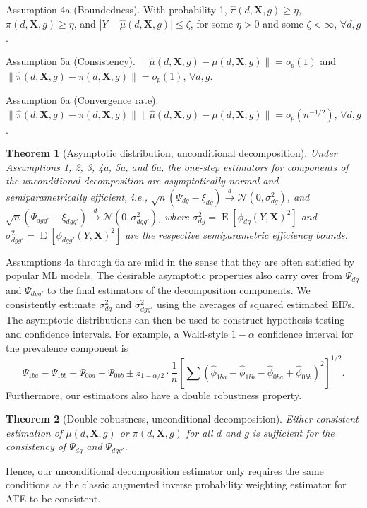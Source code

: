 \documentclass[12pt,a4paper]{article}
\newtheorem{prop}{Theorem}
\newcommand{\E}{\operatorname{E}}
\def\X{{\boldsymbol X}}
\begin{document}
Assumption 4a (Boundedness). With probability 1, $\hat{\pi}(d,\X,g) \geq \eta$, $\pi(d,\X,g) \geq \eta$, and $|Y-\hat{\mu}(d,\X,g)| \leq \zeta$, for some $\eta>0$ and some $\zeta < \infty$, $\forall d, g$.

Assumption 5a (Consistency).  $\| \hat{\mu}(d,\X,g) - \mu(d,\X,g) \| =o_p(1)$ and $\| \hat{\pi}(d,\X,g) - \pi(d,\X,g) \| =o_p(1)$, $\forall d, g$.

Assumption 6a (Convergence rate).  $\|\hat{\pi}(d,\X,g)-\pi(d,\X,g)\| \|\hat{\mu}(d,\X,g)-\mu(d,\X,g)\|=o_p(n^{-1/2})$, $\forall d, g$.

\begin{prop}[Asymptotic distribution, unconditional decomposition]
Under Assumptions 1, 2, 3, 4a, 5a, and 6a, the one-step estimators for components of the unconditional decomposition are asymptotically normal and semiparametrically efficient, i.e., $\sqrt{n}(\Psi_{dg} - \xi_{dg}) \xrightarrow{d} \mathcal{N}(0, \sigma^2_{dg})$, and $\sqrt{n}(\Psi_{dgg'} - \xi_{dgg'}) \xrightarrow{d} \mathcal{N}(0, \sigma^2_{dgg'})$, where $\sigma^2_{dg}=\E[\phi_{dg}(Y,\X)^2]$ and $\sigma^2_{dgg'}=\E[\phi_{dgg'}(Y,\X)^2]$ are the respective semiparametric efficiency bounds. 
\end{prop}
Assumptions 4a through 6a are mild in the sense that they are often satisfied by popular ML models. The desirable asymptotic properties also carry over from $\Psi_{dg}$ and $\Psi_{dgg'}$ to the final estimators of the decomposition components. We consistently estimate $\sigma^2_{dg}$ and $\sigma^2_{dgg'}$ using the  averages of squared estimated EIFs. The asymptotic distributions can then be used to construct hypothesis testing and confidence intervals. For example, a Wald-style $1-\alpha$ confidence interval for the prevalence component is $$\Psi_{1ba}-\Psi_{1bb}-\Psi_{0ba}+\Psi_{0bb} \pm z_{1-\alpha/2} \cdot \frac{1}{n} \left[\sum  \left(\hat{\phi}_{1ba}-\hat{\phi}_{1bb}-  \hat{\phi}_{0ba}+\hat{\phi}_{0bb}\right)^2 \right]^{1/2}.$$ Furthermore, our estimators also have a double robustness property. 

\begin{prop}[Double robustness, unconditional decomposition]
Either consistent estimation of $\mu(d,\X,g)$ or $\pi(d,\X,g)$ for all $d$ and $g$ is sufficient for the consistency of $\Psi_{dg}$ and $\Psi_{dgg'}$.  
\end{prop}
Hence, our unconditional decomposition estimator only requires the same conditions as the classic augmented inverse probability weighting estimator for ATE \citep{robins_estimation_1994, hirano_efficient_2003} to be consistent. 
\end{document}
